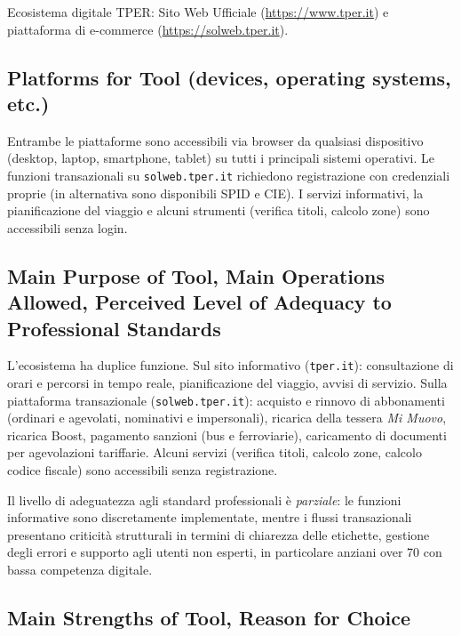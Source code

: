\documentclass[11pt,a4paper]{article}
\begin{document}
\noindent Ecosistema digitale TPER: Sito Web Ufficiale (\url{https://www.tper.it})
e piattaforma di e-commerce (\url{https://solweb.tper.it}).

\subsection*{Platforms for Tool (devices, operating systems, etc.)}

\noindent Entrambe le piattaforme sono accessibili via browser da qualsiasi
dispositivo (desktop, laptop, smartphone, tablet) su tutti i principali
sistemi operativi. Le funzioni transazionali su \texttt{solweb.tper.it}
richiedono registrazione con credenziali proprie (in alternativa sono
disponibili SPID e CIE). I servizi informativi, la pianificazione del
viaggio e alcuni strumenti (verifica titoli, calcolo zone) sono
accessibili senza login.

\subsection*{Main Purpose of Tool, Main Operations Allowed, Perceived Level of Adequacy to Professional Standards}

\noindent L'ecosistema ha duplice funzione. Sul sito informativo
(\texttt{tper.it}): consultazione di orari e percorsi in tempo reale,
pianificazione del viaggio, avvisi di servizio. Sulla piattaforma
transazionale (\texttt{solweb.tper.it}): acquisto e rinnovo di abbonamenti
(ordinari e agevolati, nominativi e impersonali), ricarica della tessera
\textit{Mi Muovo}, ricarica Boost, pagamento sanzioni (bus e ferroviarie),
caricamento di documenti per agevolazioni tariffarie. Alcuni servizi
(verifica titoli, calcolo zone, calcolo codice fiscale) sono accessibili
senza registrazione.

\noindent Il livello di adeguatezza agli standard professionali è
\textit{parziale}: le funzioni informative sono discretamente implementate,
mentre i flussi transazionali presentano criticità strutturali in termini
di chiarezza delle etichette, gestione degli errori e supporto agli utenti
non esperti, in particolare anziani over 70 con bassa competenza digitale.

\subsection*{Main Strengths of Tool, Reason for Choice}
\end{document}

